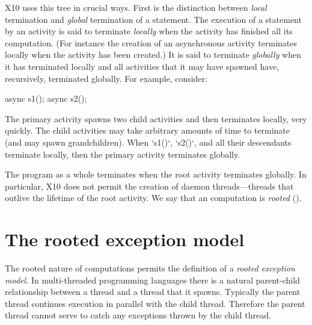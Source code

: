 X10 uses this tree in crucial ways.  
First is the distinction 
between {\em local} termination and {\em global}
termination of a statement. The execution of a statement by an
activity is said to terminate {\em locally} when the activity has finished
all its computation. (For instance the
creation of an asynchronous activity terminates locally when the
activity has been created.)  It is said to terminate {\em globally} when it
has terminated locally and all activities that it may have spawned 
have, recursively, terminated globally.
For example, consider: 
\begin{xten}
async {s1();}
async {s2();}
\end{xten}
The primary activity spawns two child activities and then terminates locally,
very quickly.  The child activities may take arbitrary amounts of time to
terminate (and may spawn grandchildren).  When \xcd`s1()`, \xcd`s2()`, and
all their descendants terminate locally, then the primary activity terminates
globally. 

The program as a whole terminates when the root activity terminates globally.
In particular, X10 does not permit the creation of 
daemon threads---threads that outlive the lifetime of the root
activity.  We say that an \Xten{} computation is {\em rooted}
().


\section{The \Xten{} rooted exception model}
\label{ExceptionModel}


The rooted nature of \Xten{} computations permits the definition of a
{\em rooted exception model.} In multi-threaded programming languages
there is a natural parent-child relationship between a thread and a
thread that it spawns. Typically the parent thread continues execution
in parallel with the child thread. Therefore the parent thread cannot
serve to catch any exceptions thrown by the child thread. 

